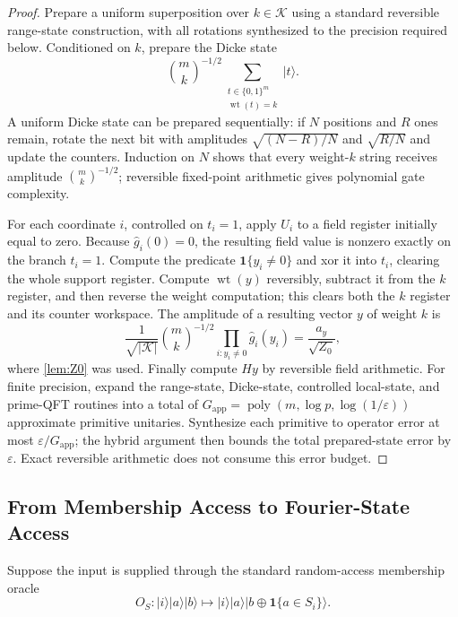 \documentclass[10pt,a4paper]{amsart}
\newcommand{\Kcal}{\mathcal{K}}
\newcommand{\wt}{\operatorname{wt}}
\newcommand{\poly}{\operatorname{poly}}
\newcommand{\ket}[1]{\lvert #1\rangle}
\newcommand{\abs}[1]{\left\lvert #1\right\rvert}
\newcommand{\one}{\mathbf{1}}
\begin{document}
\begin{proof}
Prepare a uniform superposition over $k\in\Kcal$ using a standard reversible range-state construction, with all rotations synthesized to the precision required below. Conditioned on $k$, prepare the Dicke state
\[
   \binom mk^{-1/2}\sum_{\substack{t\in\{0,1\}^m\\\wt(t)=k}}\ket{t}.
\]
A uniform Dicke state can be prepared sequentially: if $N$ positions and $R$ ones remain, rotate the next bit with amplitudes $\sqrt{(N-R)/N}$ and $\sqrt{R/N}$ and update the counters.  Induction on $N$ shows that every weight-$k$ string receives amplitude $\binom mk^{-1/2}$; reversible fixed-point arithmetic gives polynomial gate complexity.

For each coordinate $i$, controlled on $t_i=1$, apply $U_i$ to a field register initially equal to zero.  Because $\widehat g_i(0)=0$, the resulting field value is nonzero exactly on the branch $t_i=1$.  Compute the predicate $\one\{y_i\ne0\}$ and xor it into $t_i$, clearing the whole support register.  Compute $\wt(y)$ reversibly, subtract it from the $k$ register, and then reverse the weight computation; this clears both the $k$ register and its counter workspace.  The amplitude of a resulting vector $y$ of weight $k$ is
\[
   \frac1{\sqrt{\abs{\Kcal}}}\binom mk^{-1/2}
   \prod_{i:y_i\ne0}\widehat g_i(y_i)
   =\frac{a_y}{\sqrt{Z_0}},
\]
where \cref{lem:Z0} was used.  Finally compute $Hy$ by reversible field arithmetic.  For finite precision, expand the range-state, Dicke-state, controlled local-state, and prime-QFT routines into a total of $G_{\mathrm{app}}=\poly(m,\log p,\log(1/\varepsilon))$ approximate primitive unitaries.  Synthesize each primitive to operator error at most $\varepsilon/G_{\mathrm{app}}$; the hybrid argument then bounds the total prepared-state error by $\varepsilon$.  Exact reversible arithmetic does not consume this error budget.
\end{proof}

\subsection{From Membership Access to Fourier-State Access}

Suppose the input is supplied through the standard random-access membership oracle
\begin{equation}
   O_S:\ket{i}\ket{a}\ket{b}
   \longmapsto
   \ket{i}\ket{a}\ket{b\oplus\one\{a\in S_i\}}.
   \label{eq:membership-oracle}
\end{equation}
\end{document}
